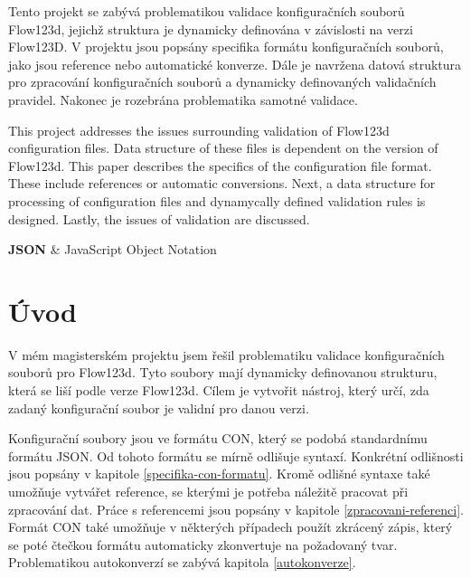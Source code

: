 \documentclass[FM,MP]{tulthesis}
\begin{document}
\renewcommand{\thetable}{\arabic{table}}
\renewcommand{\thefigure}{\arabic{figure}}


\begin{abstractCZ}
	Tento projekt se zabývá problematikou validace konfiguračních souborů Flow123d, jejichž struktura je dynamicky definována v závislosti na verzi Flow123D. V projektu jsou popsány specifika formátu konfiguračních souborů, jako jsou reference nebo automatické konverze. Dále je navržena datová struktura pro zpracování konfiguračních souborů a dynamicky definovaných validačních pravidel. Nakonec je rozebrána problematika samotné validace. 
\end{abstractCZ}
\vspace{2cm}
\begin{abstractEN}
	This project addresses the issues surrounding validation of Flow123d configuration files. Data structure of these files is dependent on the version of Flow123d. This paper describes the specifics of the configuration file format. These include references or automatic conversions. Next, a data structure for processing of configuration files and dynamycally defined validation rules is designed. Lastly, the issues of validation are discussed.
\end{abstractEN}

\tableofcontents
\clearpage

\begin{abbrList}
\textbf{JSON} & JavaScript Object Notation \\
\end{abbrList}

\chapter{Úvod}  %
	V mém magisterském projektu jsem řešil problematiku validace konfiguračních souborů pro Flow123d. Tyto soubory mají dynamicky definovanou strukturu, která se liší podle verze Flow123d. Cílem je vytvořit nástroj, který určí, zda zadaný konfigurační soubor je validní pro danou verzi.

	Konfigurační soubory jsou ve formátu CON, který se podobá standardnímu formátu JSON. Od tohoto formátu se mírně odlišuje syntaxí. Konkrétní odlišnosti jsou popsány v kapitole \ref{specifika-con-formatu}. Kromě odlišné syntaxe také umožňuje vytvářet reference, se kterými je potřeba náležitě pracovat při zpracování dat. Práce s referencemi jsou popsány v kapitole \ref{zpracovani-referenci}. Formát CON také umožňuje v některých případech použít zkrácený zápis, který se poté čtečkou formátu automaticky zkonvertuje na požadovaný tvar. Problematikou autokonverzí se zabývá kapitola \ref{autokonverze}.
\end{document}
